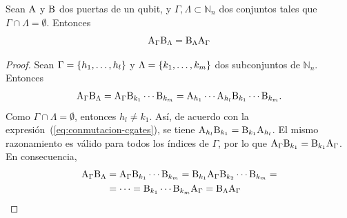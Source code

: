 	\begin{proposition}
		Sean $\text{A}$ y $\text{B}$ dos puertas de un qubit, y $\Gamma, \Lambda \subset \mathbb{N}_n$ dos conjuntos tales que $\Gamma\cap\Lambda=\emptyset$.
		Entonces
		\begin{equation}
			\label{eq:conmutacion-sets}
			\text{A}_\Gamma\text{B}_{\Lambda} = \text{B}_{\Lambda}\text{A}_{\Gamma}
		\end{equation}
	\end{proposition}
	\begin{proof}
		Sean $\Gamma=\{h_1,\dots,h_l\}$ y $\Lambda=\{k_1,\dots,k_m\}$ dos subconjuntos de $\mathbb{N}_n$. Entonces
		\begin{align*}
			\text{A}_{\Gamma}\text{B}_{\Lambda}=\text{A}_{\Gamma}\text{B}_{k_1}\cdots\text{B}_{k_m}=\text{A}_{h_1}\cdots\text{A}_{h_l}\text{B}_{k_1}\cdots\text{B}_{k_m}.
		\end{align*}
		Como $\Gamma\cap\Lambda=\emptyset$, entonces $h_l\neq k_1$. Así, de acuerdo con la expresión~(\ref{eq:conmutacion-cgates}), se tiene $\text{A}_{h_l}\text{B}_{k_1}=\text{B}_{k_1}\text{A}_{h_l}$.
		El mismo razonamiento es válido para todos los índices de $\Gamma$, por lo que $\text{A}_{\Gamma}\text{B}_{k_1}=\text{B}_{k_1}\text{A}_{\Gamma}$. En consecuencia,
		\begin{align*}
			\text{A}_{\Gamma}\text{B}_{\Lambda}&=\text{A}_{\Gamma}\text{B}_{k_1}\cdots\text{B}_{k_m}=\text{B}_{k_1}\text{A}_{\Gamma}\text{B}_{k_2}\cdots\text{B}_{k_m}=\\
			&=\dots = \text{B}_{k_1}\cdots\text{B}_{k_m}\text{A}_{\Gamma}=\text{B}_{\Lambda}\text{A}_{\Gamma}
		\end{align*}
	\end{proof}

